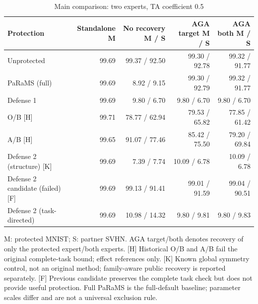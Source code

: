 \begin{table}[!htbp]
\centering
\small
\caption{Main comparison: two experts, TA coefficient 0.5}
\label{tab:main}
\begin{tabular}{lrrrr}
\toprule
Protection & Standalone M & No recovery M / S & AGA target M / S & AGA both M / S \\
\midrule
Unprotected & 99.69 & 99.37 / 92.50 & 99.30 / 92.78 & 99.32 / 91.77 \\
PaRaMS (full) & 99.69 & 8.92 / 9.15 & 99.30 / 92.79 & 99.32 / 91.77 \\
Defense 1 & 99.69 & 9.80 / 6.70 & 9.80 / 6.70 & 9.80 / 6.70 \\
O/B [H] & 99.71 & 78.77 / 62.94 & 79.53 / 65.82 & 77.85 / 61.42 \\
A/B [H] & 99.65 & 91.07 / 77.46 & 85.42 / 75.50 & 79.20 / 69.84 \\
Defense 2 (structure) [K] & 99.69 & 7.39 / 7.74 & 10.09 / 6.78 & 10.09 / 6.78 \\
Defense 2 candidate (failed) [F] & 99.69 & 99.13 / 91.41 & 99.01 / 91.59 & 99.04 / 90.51 \\
Defense 2 (task-directed) & 99.69 & 10.98 / 14.32 & 9.80 / 9.81 & 9.80 / 9.83 \\
\bottomrule
\end{tabular}
\par\vspace{3pt}\begin{minipage}{0.98\linewidth}\footnotesize M: protected MNIST; S: partner SVHN. AGA target/both denotes recovery of only the protected expert/both experts. [H] Historical O/B and A/B fail the original complete-task bound; effect references only. [K] Known global symmetry control, not an original method; family-aware public recovery is reported separately. [F] Previous candidate preserves the complete task check but does not provide useful protection. Full PaRaMS is the full-default baseline; parameter scales differ and are not a universal exclusion rule.\end{minipage}
\end{table}

